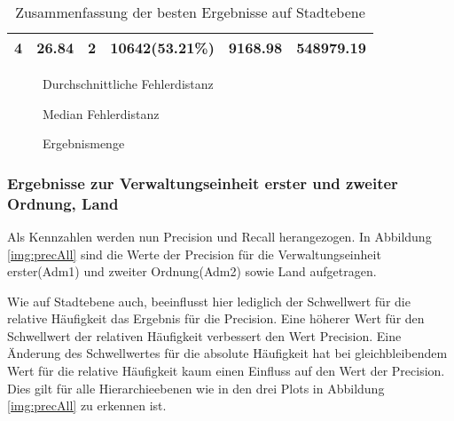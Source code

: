 \begin{table}[h]
\begin{tabular}{|l|r|r|r|r|r|}
					4 & 26.84                                                                              & 2                                                                                  & \textbf{10642(53.21\%)}                                                                         & \textbf{9168.98}                                                                  & 548979.19                                                                            \\ \hline
					\end{tabular}
					\caption{Zusammenfassung der besten Ergebnisse auf Stadtebene}
					\label{tab:optCity}
					\end{table}

				\begin{figure}[H]
					\centering
					\caption{Durchschnittliche Fehlerdistanz}
					\label{img:durchschnF}
				\end{figure}


				\begin{figure}[H]
					\centering
					\caption{Median Fehlerdistanz}
					\label{img:medianF}
				\end{figure}



				\begin{figure}[H]
					\centering
					\caption{Ergebnismenge}
					\label{img:citiesRecall}
				\end{figure}

			\subsubsection{Ergebnisse zur Verwaltungseinheit erster und zweiter Ordnung, Land}

				Als Kennzahlen werden nun Precision und Recall herangezogen. 
				In Abbildung \ref{img:precAll} sind die Werte der Precision für die Verwaltungseinheit erster(Adm1) und zweiter Ordnung(Adm2) sowie Land aufgetragen.

				Wie auf Stadtebene auch, beeinflusst hier lediglich der Schwellwert für die relative Häufigkeit das Ergebnis für die Precision. 
				Eine höherer Wert für den Schwellwert der relativen Häufigkeit verbessert den Wert Precision.
				Eine Änderung des Schwellwertes für die absolute Häufigkeit hat bei gleichbleibendem Wert für die relative Häufigkeit kaum einen Einfluss auf den Wert der Precision.
				Dies gilt für alle Hierarchieebenen wie in den drei Plots in Abbildung \ref{img:precAll} zu erkennen ist. 

